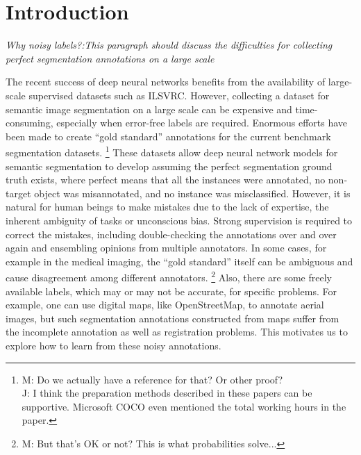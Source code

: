 \section{Introduction}
\label{introduction}

\noindent
\textit{Why noisy labels?:This paragraph should discuss the difficulties for collecting perfect segmentation annotations on a large scale}

\noindent
The recent success of deep neural networks benefits from the availability of large-scale supervised datasets such as ILSVRC\cite{russakovsky2015imagenet}.
However, collecting a dataset for semantic image segmentation on a large scale can be expensive and time-consuming, especially when error-free labels are required.
Enormous efforts have been made to create ``gold standard'' annotations for the current benchmark segmentation datasets\cite{everingham2015pascal,mottaghi2014role,lin2014microsoft}.
\footnote{M: Do we actually have a reference for that?  Or other proof?\\J: I think the preparation methods described in these papers can be supportive. Microsoft COCO even mentioned the total working hours in the paper.}
These datasets allow deep neural network models for semantic segmentation \cite{long2015fully,zheng2015conditional} to develop assuming the perfect segmentation ground truth exists, where perfect means that all the instances were annotated, no non-target object was misannotated, and no instance was misclassified.
However, it is natural for human beings to make mistakes due to the lack of expertise, the inherent ambiguity of tasks or unconscious bias.
Strong supervision is required to correct the mistakes, including double-checking the annotations over and over again and ensembling opinions from multiple annotators.
In some cases, for example in the medical imaging, the ``gold standard'' itself can be ambiguous and cause disagreement among different annotators.
\footnote{M: But that's OK or not?  This is what probabilities solve...}
Also, there are some freely available labels, which may or may not be accurate, for specific problems.
For example, one can use digital maps, like OpenStreetMap, to annotate aerial images, but such segmentation annotations constructed from maps suffer from the incomplete annotation as well as registration problems.\cite{mnih2012learning}
This motivates us to explore how to learn from these noisy annotations.

